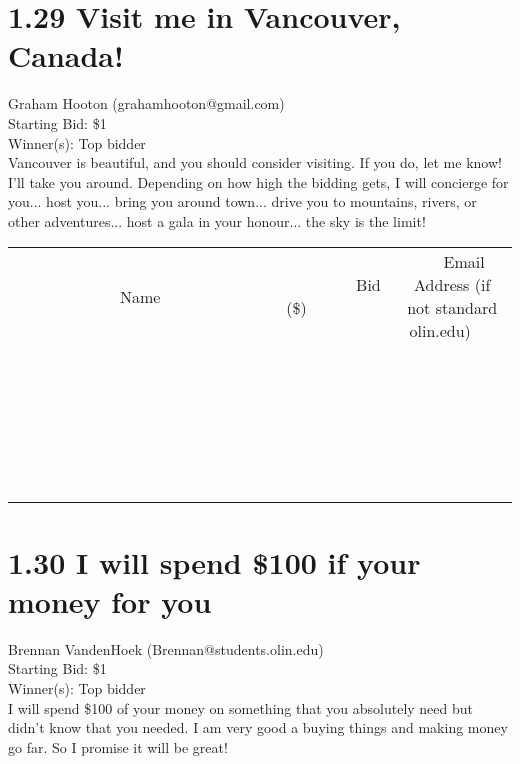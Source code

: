 \documentclass[11pt]{article}
\begin{document}
\section*{1.29 Visit me in Vancouver, Canada!}
Graham Hooton (grahamhooton@gmail.com) \\
Starting Bid: \$1 \\
Winner(s): 
Top bidder \\
Vancouver is beautiful, and you should consider visiting. If you do, let me know! I'll take you around. Depending on how high the bidding gets, I will concierge for you... host you... bring you around town... drive you to mountains, rivers, or other adventures... host a gala in your honour... the sky is the limit! \\[6ex]
\begin{tabular}{c c c}
~~~~~~~~~~~~~Name~~~~~~~~~~~~~ & ~~~~~~~~~Bid (\$)~~~~~~~~~ & ~~~Email Address (if not standard olin.edu)~~~ \\
 & & \\
\hline
 & & \\
\hline
 & & \\
\hline
 & & \\
\hline
 & & \\
\hline
 & & \\
\hline
 & & \\
\hline
 & & \\
\hline
 & & \\
\hline
 & & \\
\hline
 & & \\
\hline
 & & \\
\hline
 & & \\
\hline
 & & \\
\hline
 & & \\
\hline
 & & \\
\hline
 & & \\
\hline
 & & \\
\hline
 & & \\
\hline
 & & \\
\hline
 & & \\
\hline
 & & \\
\hline
 & & \\
\hline
 & & \\
\hline
 & & \\
\hline
 & & \\
\hline
\end{tabular}
\clearpage
\section*{1.30 I will spend \$100 if your money for you}
Brennan VandenHoek (Brennan@students.olin.edu) \\
Starting Bid: \$1 \\
Winner(s): 
Top bidder \\
I will spend \$100 of your money on something that you absolutely need but didn’t know that you needed. I am very good a buying things and making money go far. So I promise it will be great! 
\end{document}
